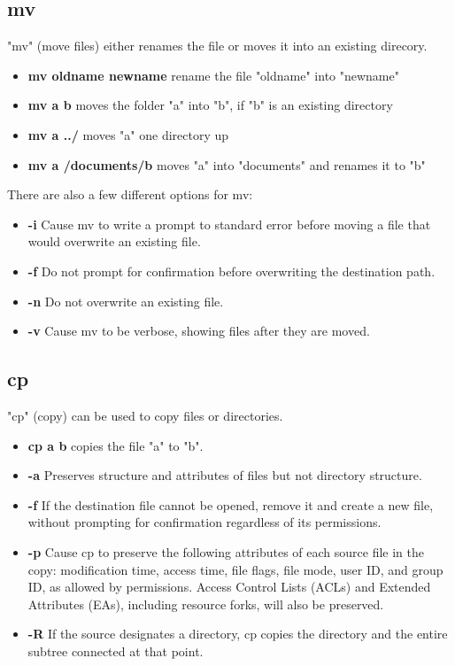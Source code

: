 \documentclass[10pt,a4paper]{scrartcl}
\begin{document}
\subsection{mv}
"mv" (move files) either renames the file or moves it into an existing direcory.
\begin{doublespacing}
\begin{itemize}
\item{\bf{mv oldname newname}} \qquad rename the file "oldname" into "newname"
\item{\bf{mv a b}} \qquad moves the folder "a" into "b", if "b" is an existing directory
\item{\bf{mv a ../}} \qquad moves "a" one directory up
\item{\bf{mv a /documents/b}} \qquad moves "a" into "documents" and renames it to "b"
\end{itemize}
There are also a few different options for mv:
\begin{itemize}
\item{\bf{-i}} \qquad  Cause mv to write a prompt to standard error before moving a file that would overwrite an existing file.
\item{\bf{-f}} \qquad Do not prompt for confirmation before overwriting the destination path.
\item{\bf{-n}} \qquad Do not overwrite an existing file.
\item{\bf{-v}} \qquad  Cause mv to be verbose, showing files after they are moved.
\end{itemize}
\end{doublespacing}

\subsection{cp}
"cp" (copy) can be used to copy files or directories.
\begin{doublespacing}
\begin{itemize}
\item{\bf{cp a b}} \qquad copies the file "a" to "b".
\item{\bf{-a}} \qquad  Preserves structure and attributes of files
           but not directory structure.
\item{\bf{-f}} \qquad  If the destination file cannot be opened, remove it and create a
           new file, without prompting for confirmation regardless of its permissions.
\item{\bf{-p}} \qquad Cause cp to preserve the following attributes of each source file in the copy: modification time, access time, file flags, file mode,
           user ID, and group ID, as allowed by permissions.  Access Control
           Lists (ACLs) and Extended Attributes (EAs), including resource
           forks, will also be preserved.
\item{\bf{-R}} \qquad  If the source designates a directory, cp copies the directory and
           the entire subtree connected at that point.
\end{itemize}
\end{doublespacing}
\end{document}
